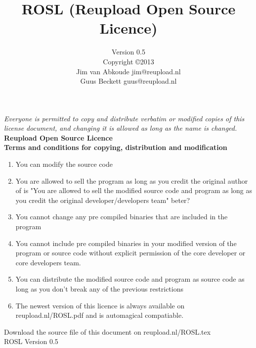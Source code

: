 \documentclass[]{article}
\begin{document}
\title{ROSL (Reupload Open Source Licence)}

\author{Version 0.5\\Copyright \copyright 2013\\Jim van Abkoude jim@reupload.nl\\Guus Beckett guus@reupload.nl}
\maketitle

\vfill
\textit{ Everyone is permitted to copy and distribute verbatim or modified copies of this license document, and changing it is allowed as long as the name is changed.\\ }
\newpage
\textbf{Reupload Open Source Licence\\
Terms and conditions for copying, distribution and modification}
\begin{enumerate}


\item You can modify the source code
\item You are allowed to sell the program as long as you credit the original author
\\ of is "You are allowed to sell the modified source code and program as long as you credit the original developer/developers team" beter?
\item You cannot change any pre compiled binaries that are included in the program
\item You cannot include pre compiled binaries in your modified version of the program or source code without explicit permission of the core developer or core developers team.
\item You can distribute the modified source code and program as source code as long as you don't break any of the previous restrictions
\item The newest version of this licence is always available on reupload.nl/ROSL.pdf and is automagical compatiable.
\end{enumerate}

\vfill 
\begin{center}
Download the source file of this document on reupload.nl/ROSL.tex\\ ROSL Version 0.5
\end{center}
\end{document}
